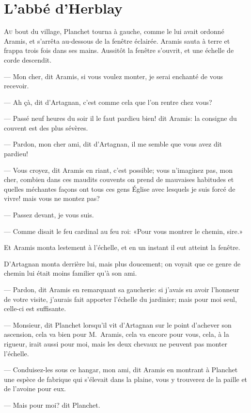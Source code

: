 \chapter{L'abbé d'Herblay}

\lettrine{A}{u} bout du village, Planchet tourna à gauche, comme le lui avait ordonné Aramis, et s'arrêta au-dessous de la fenêtre éclairée. Aramis sauta à terre et frappa trois fois dans ses mains. Aussitôt la fenêtre s'ouvrit, et une échelle de corde descendit.

— Mon cher, dit Aramis, si vous voulez monter, je serai enchanté de vous recevoir.

— Ah çà, dit d'Artagnan, c'est comme cela que l'on rentre chez vous?

— Passé neuf heures du soir il le faut pardieu bien! dit Aramis: la consigne du couvent est des plus sévères.

— Pardon, mon cher ami, dit d'Artagnan, il me semble que vous avez dit pardieu!

— Vous croyez, dit Aramis en riant, c'est possible; vous n'imaginez pas, mon cher, combien dans ces maudits couvents on prend de mauvaises habitudes et quelles méchantes façons ont tous ces gens Église avec lesquels je suis forcé de vivre! mais vous ne montez pas?

— Passez devant, je vous suis.

— Comme disait le feu cardinal au feu roi: «Pour vous montrer le chemin, sire.»

Et Aramis monta lestement à l'échelle, et en un instant il eut atteint la fenêtre.

D'Artagnan monta derrière lui, mais plus doucement; on voyait que ce genre de chemin lui était moins familier qu'à son ami.

— Pardon, dit Aramis en remarquant sa gaucherie: si j'avais su avoir l'honneur de votre visite, j'aurais fait apporter l'échelle du jardinier; mais pour moi seul, celle-ci est suffisante.

— Monsieur, dit Planchet lorsqu'il vit d'Artagnan sur le point d'achever son ascension, cela va bien pour M.~Aramis, cela va encore pour vous, cela, à la rigueur, irait aussi pour moi, mais les deux chevaux ne peuvent pas monter l'échelle.

— Conduisez-les sous ce hangar, mon ami, dit Aramis en montrant à Planchet une espèce de fabrique qui s'élevait dans la plaine, vous y trouverez de la paille et de l'avoine pour eux.

— Mais pour moi? dit Planchet.

